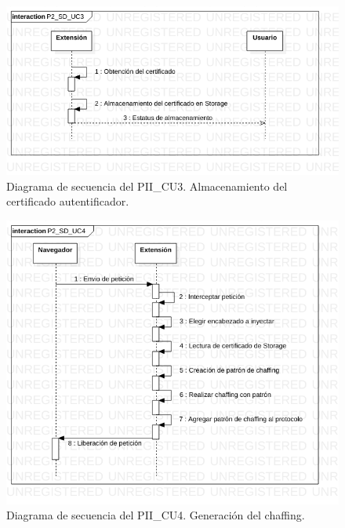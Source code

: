 \documentclass[12pt, a4paper, titlepage]{report}
\begin{document}
    			\begin{figure}[H]
    				\begin{center}    		    	\includegraphics[width=15cm]{./imagenes/Desarrollo/Prototipo_2/P2_SD_UC3.png}
    				\caption[Diagrama de secuencia 3 del Prototipo II]{Diagrama de secuencia del PII\_CU3. Almacenamiento del certificado autentificador.}
    				\end{center}
    			\end{figure}
    			
    			\begin{figure}[H]
    				\begin{center}    		    	\includegraphics[width=15cm]{./imagenes/Desarrollo/Prototipo_2/P2_SD_UC4.png}
    				\caption[Diagrama de secuencia 4 del Prototipo II]{Diagrama de secuencia del PII\_CU4. Generación del chaffing.}
    				\end{center}
    			\end{figure}
    			
\end{document}

